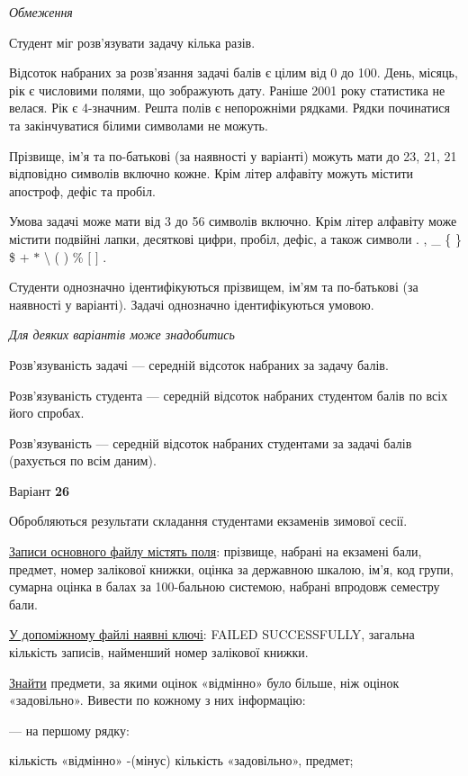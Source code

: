 \documentclass[11pt, ukrainian]{article}
\begin{document}

\bigskip\textit{Обмеження}

Студент міг розв’язувати задачу кілька разів.

Відсоток набраних за розв’язання задачі балів є цілим від 0 до 100.
День, місяць, рік є числовими полями, що зображують дату.
Раніше 2001 року статистика не велася. Рік є 4-значним.
Решта полів є непорожніми рядками.
Рядки починатися та закінчуватися білими символами не можуть.

Прізвище, ім’я та по-батькові (за наявності у варіанті) можуть мати до 23, 21, 21 відповідно символів включно кожне. 
Крім літер алфавіту можуть містити апостроф, дефіс та пробіл.

Умова задачі може мати від 3 до 56 символів включно.
Крім літер алфавіту може містити подвійні лапки, десяткові цифри, пробіл, дефіс,
а також символи . , \_ \{ \} \$ $+$ $*$ {\textbackslash} ( ) \% $[$ $]$ .

Студенти однозначно ідентифікуються прізвищем, ім’ям та по-батькові (за наявності у варіанті).
Задачі однозначно ідентифікуються умовою.

\bigskip\textit{Для деяких варіантів може знадобитись}

Розв'язуваність задачі --- середній відсоток набраних за задачу балів.

Розв'язуваність студента --- середній відсоток набраних студентом балів по всіх його спробах.

Розв'язуваність --- середній відсоток набраних студентами за задачі балів (рахується по всім даним).




\par
\newpage
{\center Варіант  \No \textbf { 26 }\par}
\bigskip
Обробляються результати складання студентами екзаменів зимової сесії.

\underline{Записи основного файлу містять поля}: прізвище, набрані на екзамені бали, предмет, номер залікової книжки, оцінка за державною шкалою, ім’я, код групи, сумарна оцінка в балах за 100-бальною системою, набрані впродовж семестру бали.

\underline{У допоміжному файлі наявні ключі}: FAILED SUCCESSFULLY, загальна кількість записів, найменший номер залікової книжки.

\underline{Знайти} предмети, за якими оцінок «відмінно» було більше, ніж оцінок «задовільно». Вивести по кожному з них інформацію:\par
{\noindent}--- на першому рядку:\par
кількість «відмінно» -(мінус) кількість «задовільно», предмет;
\end{document}
